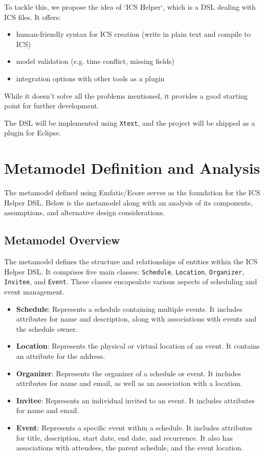 \documentclass[12pt, letterpaper, twoside]{article}
\begin{document}
To tackle this, we propose the idea of `ICS Helper`, which is a DSL dealing with ICS files. It offers:
    \begin{itemize}
        \item human-friendly syntax for ICS creation (write in plain text and compile to ICS)
        \item model validation (e.g. time conflict, missing fields)
        \item integration options with other tools as a plugin
    \end{itemize}

While it doesn't solve all the problems mentioned, it provides a good starting point for further development.

The DSL will be implemented using \texttt{Xtext}, and the project will be shipped as a plugin for Eclipse.
\newpage
\section{Metamodel Definition and Analysis}

The metamodel defined using Emfatic/Ecore serves as the foundation for the ICS Helper DSL. Below is the metamodel along with an analysis of its components, assumptions, and alternative design considerations.

\subsection{Metamodel Overview}

The metamodel defines the structure and relationships of entities within the ICS Helper DSL. It comprises five main classes: \texttt{Schedule}, \texttt{Location}, \texttt{Organizer}, \texttt{Invitee}, and \texttt{Event}. These classes encapsulate various aspects of scheduling and event management.

\begin{itemize}
    \item \textbf{Schedule}: Represents a schedule containing multiple events. It includes attributes for name and description, along with associations with events and the schedule owner.
    
    \item \textbf{Location}: Represents the physical or virtual location of an event. It contains an attribute for the address.
    
    \item \textbf{Organizer}: Represents the organizer of a schedule or event. It includes attributes for name and email, as well as an association with a location.
    
    \item \textbf{Invitee}: Represents an individual invited to an event. It includes attributes for name and email.
    
    \item \textbf{Event}: Represents a specific event within a schedule. It includes attributes for title, description, start date, end date, and recurrence. It also has associations with attendees, the parent schedule, and the event location.
\end{itemize}
\end{document}
